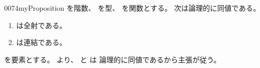 \documentclass[index]{subfiles}
\begin{document}
\begin{myBlock}{0074}{myProposition}
  を階数、
  を型、
  を関数とする。
  次は論理的に同値である。
  \begin{enumerate}
  \item {}は全射である。
  \item {}は\myInlineMath{\myTLMinusOne}連結である。
  \end{enumerate}
\end{myBlock}
\begin{myProof}
  を要素とする。
  より、
  と
  は
  論理的に同値であるから主張が従う。
\end{myProof}
\end{document}
